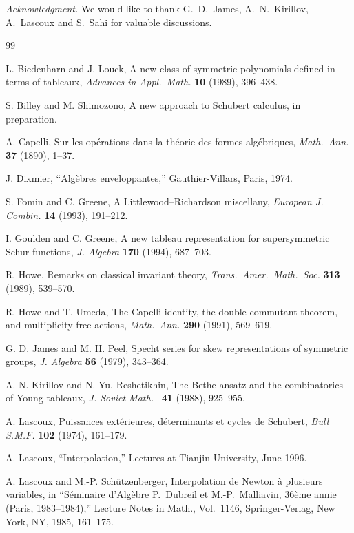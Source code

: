 \documentclass[titlepage,12pt]{article}
\newcommand{\bib}{thebibliography}
\newcommand{\0}{{\bf 0}}
\newcommand{\1}{{\bf 1}}
\newcommand{\2}{{\bf 2}}
\newcommand{\3}{{\bf 3}}
\newcommand{\4}{{\bf 4}}
\newcommand{\5}{{\bf 5}}
\newcommand{\6}{{\bf 6}}
\newcommand{\7}{{\bf 7}}
\newcommand{\8}{{\bf 8}}
\newcommand{\9}{{\bf 9}}
\begin{document}
\medskip

{\it Acknowledgment.}
We would like to thank G.~D.~James, A.~N.~Kirillov, A.~Lascoux and S.~Sahi
for
valuable discussions. 

\begin{\bib}{99}

 L. Biedenharn and J. Louck, A new class of symmetric
polynomials defined in terms of tableaux, {\it Advances in Appl.\ Math.}
{\bf 10} (1989), 396--438.

 S. Billey and M. Shimozono, A new approach to
Schubert calculus, in preparation.

 A. Capelli, Sur les op\'erations dans la th\'eorie des
formes alg\'ebriques,  {\it Math.\  Ann.\/} {\bf 37} (1890), 1--37.

 J. Dixmier, ``Alg\`ebres enveloppantes,''
Gauthier-Villars, Paris, 1974.

 S. Fomin and C. Greene, A Littlewood--Richardson
miscellany, {\it European J. Combin.\/} {\bf 14}  (1993), 191--212.


 I. Goulden and C. Greene, A new tableau representation
for supersymmetric Schur functions, {\it J. Algebra} {\bf 170} (1994),
687--703.

 R. Howe,  Remarks on classical invariant theory,
{\it Trans.\ Amer.\  Math.\ Soc.\/} {\bf 313} (1989),  539--570.

 R. Howe and T. Umeda, The Capelli identity, the
double commutant theorem, and multiplicity-free actions, {\it Math.\ 
Ann.\/}
{\bf 290} (1991), 569--619.

 G. D. James and M. H. Peel, Specht series for
skew representations of symmetric groups, {\it J. Algebra} {\bf 56} (1979),
343--364.

 A. N. Kirillov and N. Yu. Reshetikhin,
The Bethe ansatz and the combinatorics of Young tableaux,
{\it J. Soviet Math.\ } {\bf 41} (1988), 925--955.



 A. Lascoux, 
Puissances ext\'erieures, d\'eterminants et cycles 
de Schubert, {\it Bull S.M.F.} {\bf 102} (1974), 161--179.

 A. Lascoux, ``Interpolation,'' 
Lectures at Tianjin University, June 1996. 


 A. Lascoux and M.-P. Sch\"utzenberger, 
Interpolation de Newton \`a plusieurs variables, in
``S\'eminaire d'Alg\`ebre P.~Dubreil et M.-P.~Malliavin,
36\`eme annie (Paris, 1983--1984),'' Lecture Notes in
Math., Vol.\ 1146, Springer-Verlag, New York, NY, 1985, 161--175.


\end{\bib}
\end{document}

